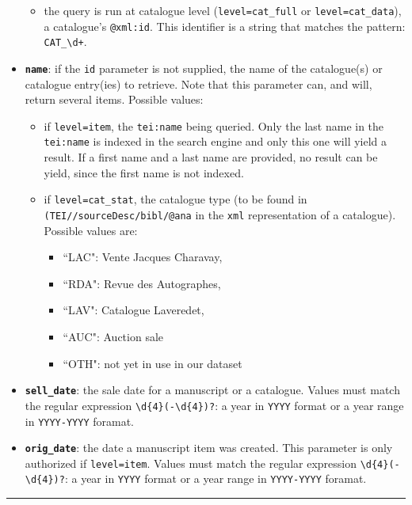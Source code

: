 \begin{itemize}
\begin{itemize}
\item the query is run at catalogue level (\texttt{level=cat\_full} or \texttt{level=cat\_data}), a 	 catalogue's \texttt{@xml:id}. This identifier is a string that matches the pattern: 	 \texttt{CAT\_\textbackslash{}d+}.
\end{itemize}
\item \textbf{\texttt{name}}: if the \texttt{id} parameter is not supplied, the name of the catalogue(s) or catalogue entry(ies) to retrieve. Note that this parameter can, and will, return several items. Possible values:
\begin{itemize} 
 \item if \texttt{level=item}, the \texttt{tei:name} being queried. Only the last name in 	 the \texttt{tei:name} is indexed in the search engine and only this one will yield a 	 result. If a first name and a last name are provided, no result can be yield, since the first name is not indexed.
\item if \texttt{level=cat\_stat}, the catalogue type (to be found in 	 \texttt{(TEI//sourceDesc/bibl/@ana} in the \texttt{xml} representation of a catalogue). 	 Possible values are:
\begin{itemize} 
 \item ``LAC": Vente Jacques Charavay,
\item ``RDA": Revue des Autographes,
\item ``LAV": Catalogue Laveredet,
\item ``AUC": Auction sale
\item ``OTH": not yet in use in our dataset
\end{itemize}
\end{itemize}
\item \textbf{\texttt{sell\_date}}: the sale date for a manuscript or a catalogue. Values must match the regular expression \texttt{\textbackslash{}d\{4\}(-\textbackslash{}d\{4\})?}: a year in \texttt{YYYY} format or a year range in \texttt{YYYY-YYYY} foramat.
\item \textbf{\texttt{orig\_date}}: the date a manuscript item was created. This parameter is only authorized if \texttt{level=item}. Values must match the regular expression \texttt{\textbackslash{}d\{4\}(-\textbackslash{}d\{4\})?}: a year in \texttt{YYYY} format or a year range in \texttt{YYYY-YYYY} foramat. 
\end{itemize}

\pagebreak
\par\noindent\rule{\linewidth}{0.4pt}

